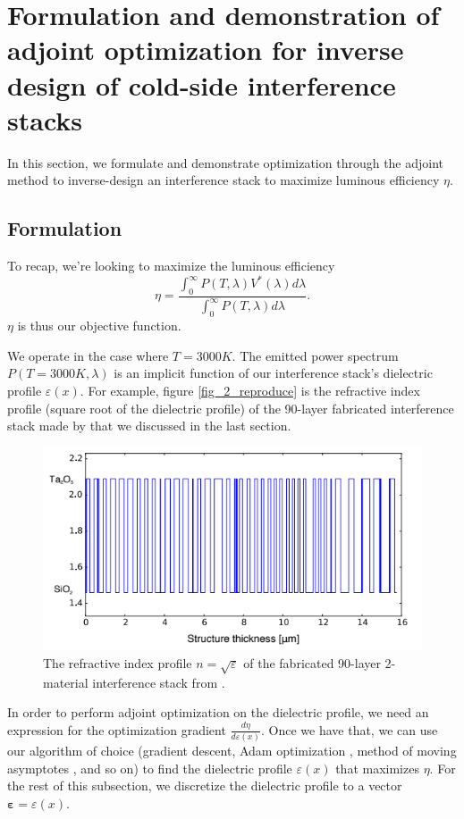 \documentclass[%
 reprint,
 amsmath,amssymb,
 aps
]{revtex4-2}
\begin{document}
\section{Formulation and demonstration of adjoint optimization for inverse design of cold-side interference stacks}
In this section, we formulate and demonstrate optimization through the adjoint method to inverse-design an interference stack to maximize luminous efficiency $\eta$.
\subsection{Formulation}
To recap, we're looking to maximize the luminous efficiency \begin{equation}\eta = \frac{\int_0^{\infty} P(T, \lambda) V^*(\lambda) d\lambda}{\int_0^\infty P(T, \lambda) d\lambda}.\end{equation}
$\eta$ is thus our objective function.

We operate in the case where $T=3000K$. The emitted power spectrum $P(T=3000 K, \lambda)$ is an implicit function of our interference stack's dielectric profile $\varepsilon(x)$. For example, figure \ref{fig_2_reproduce} is the refractive index profile (square root of the dielectric profile) of the 90-layer fabricated interference stack made by \cite{ilic} that we discussed in the last section.
\begin{figure}
\centering
\includegraphics[width=1.\linewidth]{fabricated_stack.PNG}
\caption{The refractive index profile $n = \sqrt{\varepsilon}$ of the fabricated 90-layer 2-material interference stack from \cite{ilic}.} 
\label{fabricated_Stack}
\end{figure}
In order to perform adjoint optimization on the dielectric profile, we need an expression for the optimization gradient $\frac{d \eta}{d\varepsilon(x)}$. Once we have that, we can use our algorithm of choice (gradient descent, Adam optimization \cite{adam}, method of moving asymptotes \cite{mma}, and so on) to find the dielectric profile $\varepsilon(x)$ that maximizes $\eta$. For the rest of this subsection, we discretize the dielectric profile to a vector $\pmb{\varepsilon} = \varepsilon(x)$.
\end{document}
